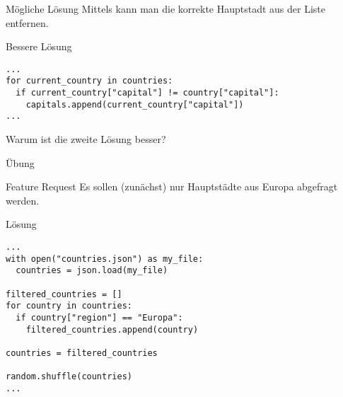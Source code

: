 \begin{fragile}
\begin{block}{Mögliche Lösung}
\vspace{2pt}
Mittels  kann man die korrekte Hauptstadt aus der Liste  entfernen. 
\end{block}

\pause 
\vspace{12pt}
\begin{block}{Bessere Lösung}
\vspace{2pt}
\begin{verbatim}
...
for current_country in countries:
  if current_country["capital"] != country["capital"]:
    capitals.append(current_country["capital"])
...
\end{verbatim}
\end{block}

\pause 
\vspace{12pt}


Warum ist die zweite Lösung besser?


\end{fragile}

\begin{frame}{Übung}

\begin{block}{Feature Request}
\vspace{2pt}
Es sollen (zunächst) nur Hauptstädte aus Europa abgefragt werden.
\end{block}
	
\end{frame}


\begin{fragile}{}
\begin{block}{Lösung}
\begin{verbatim}
...
with open("countries.json") as my_file:
  countries = json.load(my_file)

filtered_countries = []
for country in countries: 
  if country["region"] == "Europa": 
    filtered_countries.append(country)

countries = filtered_countries

random.shuffle(countries)
...
\end{verbatim}
\end{block}
\end{fragile}


